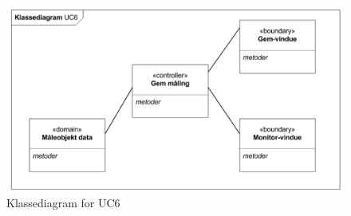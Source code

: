 \begin{figure}[H]
	\centering
	\includegraphics{Figurer/Snip20151104_42}
	\caption{Klassediagram for UC6}
\end{figure}












